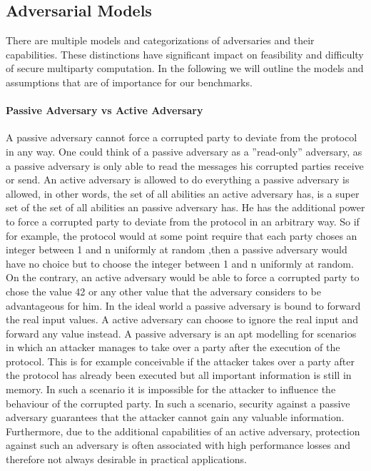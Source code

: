 \subsection{Adversarial Models}
\label{sec:Adversarial Models}
There are multiple models and categorizations of adversaries and their capabilities. These distinctions have significant impact on feasibility and difficulty of secure multiparty computation. In the following we will outline the models and assumptions that are of importance for our benchmarks. 

\paragraph{Passive Adversary vs Active Adversary}
A passive adversary cannot force a corrupted party to deviate from the protocol in any way. One could think of a passive adversary as a ''read-only'' adversary, as a passive adversary is only able to read the messages his corrupted parties receive or send. An active adversary is allowed to do everything a passive adversary is allowed, in other words, the set of all abilities an active adversary has, is a super set of the set of all abilities an passive adversary has. He has the additional power to force a corrupted party to deviate from the protocol in an arbitrary way. So if for example, the protocol would at some point require that each party choses an integer between 1 and n uniformly at random ,then a passive adversary would have no choice but to choose the integer between 1 and n uniformly at random. 
On the contrary, an active adversary would be able to force a corrupted party to chose the value 42 or any other value that the adversary considers to be advantageous for him. In the ideal world a passive adversary is bound to forward the real input values. A active adversary can choose to ignore the real input and forward any value instead. 
A passive adversary is an apt modelling for scenarios in which an attacker manages to take over a party after the execution of the protocol. This is for example conceivable if the attacker takes over a party after the protocol has already been executed but all important information is still in memory.  In such a scenario it is impossible for the attacker to influence the behaviour of the corrupted party. In such a scenario, security against a passive adversary guarantees that the attacker cannot gain any valuable information. Furthermore, due to the additional capabilities of an active adversary, protection against such an adversary is often associated with high performance losses and therefore not always desirable in practical applications.




